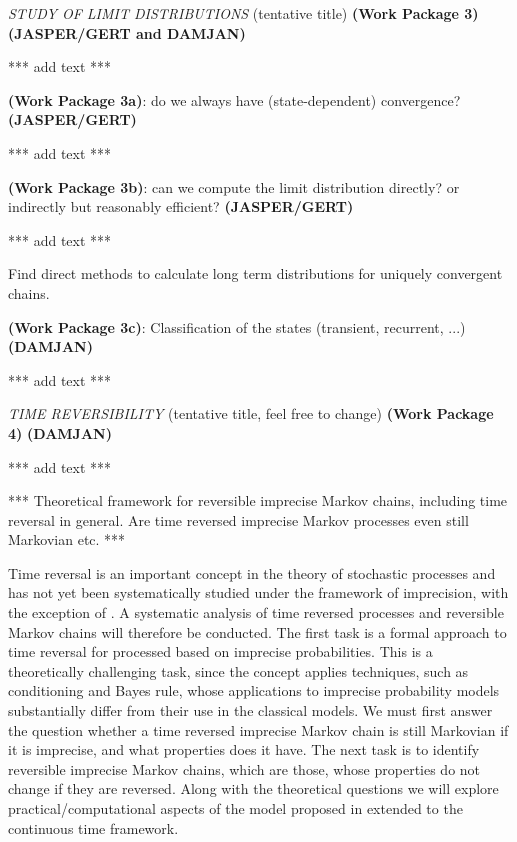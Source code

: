 \documentclass[11pt,dvipsnames,usenames,a4paper]{article}
\begin{document}
\emph{STUDY OF LIMIT DISTRIBUTIONS} (tentative title) {\bf (Work Package 3)} 
{\bf\color{blue} (JASPER/GERT and DAMJAN)}

*** add text ***

{\bf (Work Package 3a)}: do we always have (state-dependent) convergence? {\bf\color{blue} (JASPER/GERT)}

*** add text ***

{\bf (Work Package 3b)}: can we compute the limit distribution directly? or indirectly but reasonably efficient? {\bf\color{blue} (JASPER/GERT)}

*** add text ***

Find direct methods to calculate long term distributions for uniquely convergent chains. 

{\bf (Work Package 3c)}: Classification of the states (transient, recurrent, ...) {\bf\color{blue} (DAMJAN)}

*** add text ***

\emph{TIME REVERSIBILITY} (tentative title, feel free to change) {\bf (Work Package 4)} 
{\bf\color{blue} (DAMJAN)}

*** add text ***

*** Theoretical framework for reversible imprecise Markov chains, including time reversal in general. Are time reversed imprecise Markov processes even still Markovian etc. ***


Time reversal is an important concept in the theory of stochastic processes and has not yet been systematically studied under the framework of imprecision, with the exception of \cite{skulj:16}. A systematic analysis of time reversed processes and reversible Markov chains will therefore be conducted. The first task is a formal approach to time reversal for processed based on imprecise probabilities. This is a theoretically challenging task, since the concept applies techniques, such as conditioning and Bayes rule, whose applications to imprecise probability models substantially differ from their use in the classical models. We must first answer the question whether a time reversed imprecise Markov chain is still Markovian if it is imprecise, and what properties does it have. The next task is to identify reversible imprecise Markov chains, which are those, whose properties do not change if they are reversed. Along with the theoretical questions we will explore practical/computational aspects of the model proposed in \cite{skulj:16} extended to the continuous time framework. 
\end{document}
